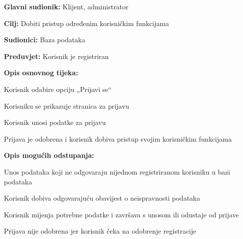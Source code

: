 						\noindent {}
						\begin{packed_item}
							
							\item \textbf{Glavni sudionik: } Klijent, administrator
							\item  \textbf{Cilj:} Dobiti pristup određenim korisničkim funkcijama
							\item  \textbf{Sudionici:} Baza podataka
							\item  \textbf{Preduvjet:} Korisnik je registriran
							\item  \textbf{Opis osnovnog tijeka:}
							
							\item[] \begin{packed_enum}
								
								\item 	Korisnik odabire opciju „Prijavi se“
								\item 	Korisniku se prikazuje stranica za prijavu
								\item 	Korisnik unosi podatke za prijavu
								\item 	Prijava je odobrena i korisnik dobiva pristup svojim korisničkim funkcijama
								
								
								
								
							\end{packed_enum}
							
							\item  \textbf{Opis mogućih odstupanja:}
							
							\item[] \begin{packed_item}
								
								\item[3.a] Unos podataka koji ne odgovaraju nijednom registriranom korisniku u bazi podataka
								\item[] \begin{packed_enum}
									
									\item Korisnik dobiva odgovarajuću obavijest o neispravnosti podataka
									\item Korisnik mijenja potrebne podatke i završava s unosom ili odustaje od prijave
									
									
								\end{packed_enum}
								\item[4.a] Prijava nije odobrena jer korisnik čeka na odobrenje registracije
								\item[] \begin{packed_enum}
									

\end{packed_enum}
\end{packed_item}
\end{packed_item}
